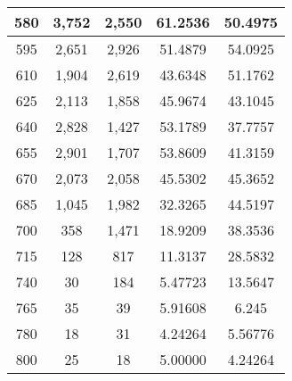 \documentclass{article}
\begin{document}
\begin{table}
\begin{tabular}{|*{5}{c|}}
580 & 	3,752 & 2,550 & 61.2536 & 50.4975 \\ \hline 
595 & 	2,651 & 2,926 & 51.4879 & 54.0925 \\ \hline 
610 & 	1,904 & 2,619 & 43.6348 & 51.1762 \\ \hline 
625 & 	2,113 & 1,858 & 45.9674 & 43.1045 \\ \hline 
640 & 	2,828 & 1,427 & 53.1789 & 37.7757 \\ \hline 
655 & 	2,901 & 1,707 & 53.8609 & 41.3159 \\ \hline 
670 & 	2,073 & 2,058 & 45.5302 & 45.3652 \\ \hline 
685 & 	1,045 & 1,982 & 32.3265 & 44.5197 \\ \hline 
700 & 	  358 & 1,471 & 18.9209 & 38.3536 \\ \hline 
715 & 	  128 &   817 & 11.3137 & 28.5832 \\ \hline 
740 & 	   30 &   184 & 5.47723 & 13.5647 \\ \hline 
765 & 	   35 &    39 & 5.91608 & 6.245 \\ \hline 
780 & 18 & 31 & 4.24264 & 5.56776 \\ \hline 
800 & 25 & 18 & 5.00000 & 4.24264 \\ \hline 
\end{tabular} 
\end{table}
\end{document}
